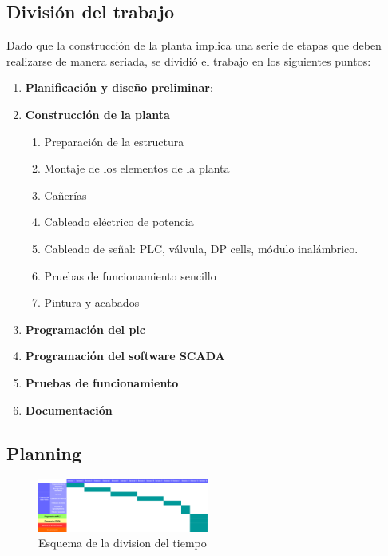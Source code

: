\subsection{División del trabajo}
Dado que la construcción de la planta implica una serie de etapas que
deben realizarse de manera seriada, se dividió el trabajo en los siguientes puntos:
\begin{enumerate}
 \item \textbf{Planificación y diseño preliminar}:
  \item \textbf{Construcción de la planta}
  \begin{enumerate}
   \item Preparación de la estructura
   \item Montaje de los elementos de la planta
   \item Cañerías
   \item Cableado eléctrico de potencia
   \item Cableado de señal: PLC, válvula, DP cells, módulo inalámbrico.
   \item Pruebas de funcionamiento sencillo
   \item Pintura y acabados
  \end{enumerate}
  \item \textbf{Programación del \gls{plc}}
  \item \textbf{Programación del software SCADA}
  \item \textbf{Pruebas de funcionamiento}
  \item \textbf{Documentación}
\end{enumerate}

\subsection{Planning}
\begin{figure}[ht!]
	\centering
	\includegraphics[angle=-90,width=0.5\textwidth]{Cap1-Introduccion/EDT.pdf}%
	\caption{Esquema de la division del tiempo} 
	\label{fig:EDT}
\end{figure}
